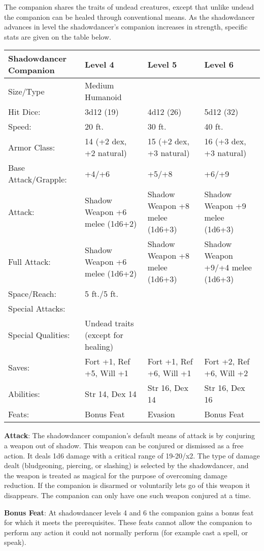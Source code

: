 The companion shares the traits of undead creatures, except that unlike undead the companion can be healed through conventional means. As the shadowdancer advances in level the shadowdancer's companion increases in strength, specific stats are given on the table below.

\begin{center}
\begin{adjustwidth}{-4cm}{}
\begin{small}
\begin{tabular}{| l | l | l | l |}
\hline
Shadowdancer Companion &Level 4 &Level 5 &Level 6 \\
\hline
Size/Type &Medium Humanoid & & \\
Hit Dice: &3d12 (19) &4d12 (26) &5d12 (32) \\
Speed: &20 ft. &30 ft. &40 ft. \\
Armor Class: &14 (+2 dex, +2 natural) &15 (+2 dex, +3 natural) &16 (+3 dex, +3 natural) \\
Base Attack/Grapple: &+4/+6 &+5/+8 &+6/+9 \\
Attack: &Shadow Weapon +6 melee (1d6+2) &Shadow Weapon +8 melee (1d6+3) &Shadow Weapon +9 melee (1d6+3) \\
Full Attack: &Shadow Weapon +6 melee (1d6+2) &Shadow Weapon +8 melee (1d6+3) &Shadow Weapon +9/+4 melee (1d6+3) \\
Space/Reach: &5 ft./5 ft. & & \\
Special Attacks: & & & \\
Special Qualities: &Undead traits (except for healing) & & \\
Saves: &Fort +1, Ref +5, Will +1 &Fort +1, Ref +6, Will +1 &Fort +2, Ref +6, Will +2 \\
Abilities: &Str 14, Dex 14 &Str 16, Dex 14 &Str 16, Dex 16 \\
Feats: &Bonus Feat &Evasion &Bonus Feat \\
\hline
\end{tabular}
\end{small}
\end{adjustwidth}
\end{center}

\textbf{Attack}: The shadowdancer companion's default means of attack is by conjuring a weapon out of shadow. This weapon can be conjured or dismissed as a free action. It deals 1d6 damage with a critical range of 19-20/x2. The type of damage dealt (bludgeoning, piercing, or slashing) is selected by the shadowdancer, and the weapon is treated as magical for the purpose of overcoming damage reduction. If the companion is disarmed or voluntarily lets go of this weapon it disappears. The companion can only have one such weapon conjured at a time.

\textbf{Bonus Feat}: At shadowdancer levels 4 and 6 the companion gains a bonus feat for which it meets the prerequisites. These feats cannot allow the companion to perform any action it could not normally perform (for example cast a spell, or speak).